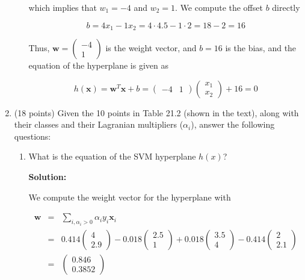 \documentclass[11pt]{article}
\begin{document}
\begin{enumerate}
\begin{enumerate}
which implies that $w_1 = -4$ and $w_2 = 1$. We compute the offset $b$ directly

\begin{equation*}
b = 4 x_1 - 1 x_2 = 4 \cdot 4.5 - 1 \cdot 2 = 18 - 2 = 16
\end{equation*}

Thus, $\mathbf{w} = \left( \begin{array}{c} -4 \\ 1 \end{array} \right)$ is the weight vector, and $b = 16$ is the bias, and the equation of the hyperplane is given as

\begin{equation*}
h(\mathbf{x}) = \mathbf{w}^\mathit{T} \mathbf{x} + b = (\begin{array}{cc} -4 & 1 \end{array}) \left( \begin{array}{c} x_1 \\ x_2 \end{array} \right) + 16 = 0
\end{equation*}

\end{enumerate}

\item (18 points) Given the 10 points in Table 21.2 (shown in the text), along with their classes and their Lagranian multipliers ($\alpha_i$), answer the following questions:

\begin{enumerate}
\item What is the equation of the SVM hyperplane $h(x)$?

\textbf{Solution:}

We compute the weight vector for the hyperplane with

\begin{eqnarray*}
\mathbf{w} &=& \sum\limits_{i,\alpha_i > 0} \alpha_i y_i \mathbf{x}_i \\
&=& 0.414 \left( \begin{array}{c} 4 \\ 2.9 \end{array} \right) 
-0.018 \left( \begin{array}{c} 2.5 \\ 1 \end{array} \right)
+0.018 \left( \begin{array}{c} 3.5 \\ 4 \end{array} \right)
-0.414 \left( \begin{array}{c} 2 \\ 2.1 \end{array} \right) \\
&=& \left( \begin{array}{c} 0.846 \\ 0.3852 \end{array} \right)
\end{eqnarray*}


\end{enumerate}
\end{enumerate}
\end{document}
